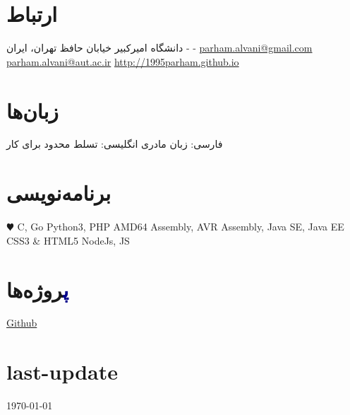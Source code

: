 \documentclass[]{friggeri-cv} %
\begin{document}


\begin{aside} %
\section{\textcolor{TextYellow}{ا}رتباط}
دانشگاه امیرکبیر
خیابان حافظ
تهران، ایران
-
-
\href{mailto:parham.alvani@gmail.com}{parham.alvani@gmail.com}
\href{mailto:parham.alvani@aut.ac.ir}{parham.alvani@aut.ac.ir}
\href{http://1995parham.github.io/}{http://1995parham.github.io}
\section{\textcolor{TextOrange}{ز}بان‌ها}
فارسی:
زبان مادری
انگلیسی:
تسلط محدود برای کار
\section{\textcolor{TextGreen}{ب}رنامه‌نویسی}
\begin{latin}
{\color{red} $\varheartsuit$} C, Go
Python3, PHP
AMD64 Assembly,
AVR Assembly,
Java SE, Java EE
CSS3 \& HTML5
NodeJs, JS
\end{latin}
\section{\textcolor{DarkBlue}{پ}روژه‌ها}
\href{https://github.com/1995parham}{\textcolor{TextGreen}{\faGithub} Github}
\section{\textcolor{Ocean}{last}-update}
\today
\end{aside}

\end{document}
